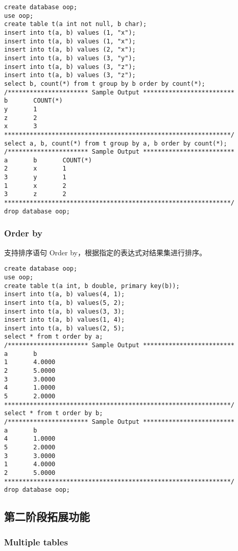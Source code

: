 \documentclass[12pt,a4paper]{article}
\begin{document}
\begin{lstlisting}
create database oop; 
use oop;
create table t(a int not null, b char);
insert into t(a, b) values (1, "x");
insert into t(a, b) values (1, "x");
insert into t(a, b) values (2, "x");
insert into t(a, b) values (3, "y");
insert into t(a, b) values (3, "z");
insert into t(a, b) values (3, "z");
select b, count(*) from t group by b order by count(*);
/********************** Sample Output *************************
b       COUNT(*)
y       1
z       2
x       3
**************************************************************/
select a, b, count(*) from t group by a, b order by count(*); 
/********************** Sample Output *************************
a       b       COUNT(*)
2       x       1
3       y       1
1       x       2
3       z       2
**************************************************************/
drop database oop;
\end{lstlisting}
    
\subsubsection{Order by}

支持排序语句 Order by，根据指定的表达式对结果集进行排序。

\begin{lstlisting}
create database oop;
use oop;
create table t(a int, b double, primary key(b)); 
insert into t(a, b) values(4, 1); 
insert into t(a, b) values(5, 2); 
insert into t(a, b) values(3, 3); 
insert into t(a, b) values(1, 4); 
insert into t(a, b) values(2, 5); 
select * from t order by a; 
/********************** Sample Output *************************
a       b       
1       4.0000  
2       5.0000  
3       3.0000  
4       1.0000  
5       2.0000  
**************************************************************/
select * from t order by b; 
/********************** Sample Output *************************
a       b       
4       1.0000  
5       2.0000  
3       3.0000  
1       4.0000  
2       5.0000  
**************************************************************/
drop database oop;
\end{lstlisting}

\subsection{第二阶段拓展功能}

\subsubsection{Multiple tables}
\end{document}
